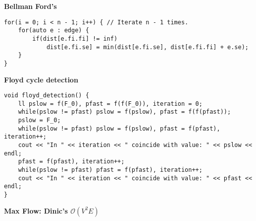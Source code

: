 \documentclass[a4paper,10pt]{article}
\newcommand{\titleAlg}[1]{\vspace{-10pt}
\begin{center}\textbf{#1}\end{center} \vspace{-10pt}}
\begin{document}
\titleAlg{Bellman Ford's}
\begin{verbatim}
for(i = 0; i < n - 1; i++) { // Iterate n - 1 times.
    for(auto e : edge) {
        if(dist[e.fi.fi] != inf)
            dist[e.fi.se] = min(dist[e.fi.se], dist[e.fi.fi] + e.se);
    }
}
\end{verbatim}
\titleAlg{Floyd cycle detection}
\begin{verbatim}
void floyd_detection() {
    ll pslow = f(F_0), pfast = f(f(F_0)), iteration = 0;
    while(pslow != pfast) pslow = f(pslow), pfast = f(f(pfast));
    pslow = F_0;
    while(pslow != pfast) pslow = f(pslow), pfast = f(pfast), iteration++;
    cout << "In " << iteration << " coincide with value: " << pslow << endl;
    pfast = f(pfast), iteration++;
    while(pslow != pfast) pfast = f(pfast), iteration++;
    cout << "In " << iteration << " coincide with value: " << pfast << endl;
}
\end{verbatim}
\titleAlg{Max Flow: Dinic's $\mathcal{O}(V^2E)$}
\end{document}
